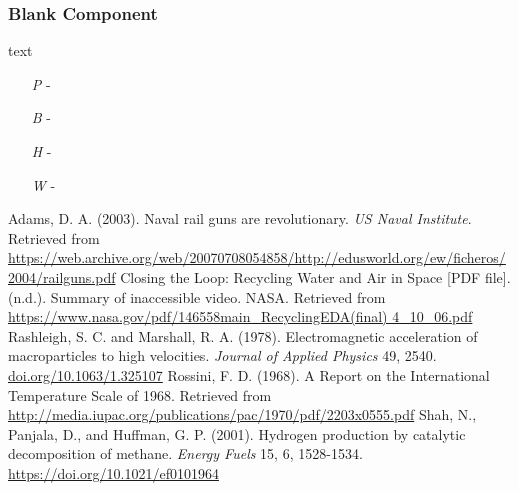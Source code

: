 \documentclass[a4paper]{article}
\begin{document}
\vspace{-0.5cm} \hspace{-18pt} \subsubsection{Blank Component} \label{blank_blank2} \vspace{-0.2cm}
text
\begin{enumerate}
\item [\textit{P}] - 
\item [\textit{B}] - 
\item [\textit{H}] - 
\item [\textit{W}] - 
\end{enumerate}


\newpage
\begin{thebibliography}{5} %
Adams, D. A. (2003). Naval rail guns are revolutionary. \textit{US Naval Institute}. Retrieved from \url{https://web.archive.org/web/20070708054858/http://edusworld.org/ew/ficheros/2004/railguns.pdf}
Closing the Loop: Recycling Water and Air in Space [PDF file]. (n.d.). Summary of inaccessible video. NASA. Retrieved from \url{https://www.nasa.gov/pdf/146558main_RecyclingEDA(final) 4_10_06.pdf}
Rashleigh, S. C. and Marshall, R. A. (1978). Electromagnetic acceleration of macroparticles to high velocities. \textit{Journal of Applied Physics} 49, 2540. \url{doi.org/10.1063/1.325107}	
Rossini, F. D. (1968). A Report on the International Temperature Scale of 1968. Retrieved from \url{http://media.iupac.org/publications/pac/1970/pdf/2203x0555.pdf}
Shah, N., Panjala, D., and Huffman, G. P. (2001). Hydrogen production by catalytic decomposition of methane. \textit{Energy Fuels} 15, 6, 1528-1534. \url{https://doi.org/10.1021/ef0101964}
\end{thebibliography}
\end{document}

